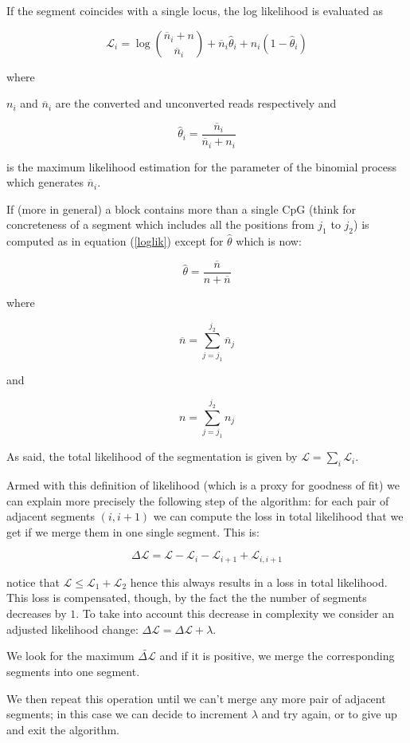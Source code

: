 \documentclass[11pt]{amsart}
\newcommand{\lik}{\ensuremath{\mathcal{L}}}
\begin{document}
If the
segment coincides with a single locus, 
the log likelihood  is evaluated as 

\[\lik_i=\log {\overline{n}_i+n \choose \overline{n}_i} +
	{\overline{n}_i}\hat{\theta}_i+
	n_i(1-\hat{\theta}_i)
\]\label{loglik}

where

$n_i$ and $\overline{n}_i$ are the converted and unconverted reads respectively 
and

\[\hat{\theta}_i=\frac{\overline{n}_i}{\overline{n}_i+n_i}\]

is the maximum likelihood estimation for the parameter of the binomial process 
which generates $\overline{n}_i$.

If (more in general) a block contains  more than a single CpG  
(think for concreteness of a segment which includes all the positions from 
$j_1$ to $j_2$) is 
computed as in equation (\ref{loglik}) except for $\hat{\theta}$ which is now:

\[
\hat{\theta}=\frac{\overline{n}}{n + \overline{n}}
\]

where

\[
	\overline{n}=\sum_{j=j_1}^{j_2} \overline{n}_j
\]

and

\[
	n=\sum_{j=j_1}^{j_2} n_j
\]


As said, the total likelihood of the segmentation is given by 
$\mathcal{L}=\sum_i\mathcal{L}_i$.

Armed with this definition of likelihood (which is a proxy for goodness of fit) 
we can explain more precisely the following step of the algorithm:
for each pair of adjacent segments $(i,i+1)$ we can compute the loss in 
total likelihood that we get if we merge them
in one single segment. This is:

\[\Delta \lik=\lik-\mathcal{L}_i-\mathcal{L}_{i+1}+\mathcal{L}_{i,i+1}\]

notice that $\mathcal{L} \leq \mathcal{L}_1+\mathcal{L}_2$ hence this always 
results in a loss in total 
likelihood. This loss is compensated, though, by the fact the the number 
of segments decreases by $1$. To take into account this decrease in 
complexity we consider an adjusted likelihood change:
$\Delta \lik = \Delta \lik+\lambda$.

We look for the maximum $\tilde{\Delta \lik}$ and if it is positive, we merge the
corresponding segments into one segment.

We then repeat this operation until we can't merge any more pair of adjacent 
segments; in this case we can decide to increment 
$\lambda$ and try again, or to give up and exit the algorithm.
\end{document}
